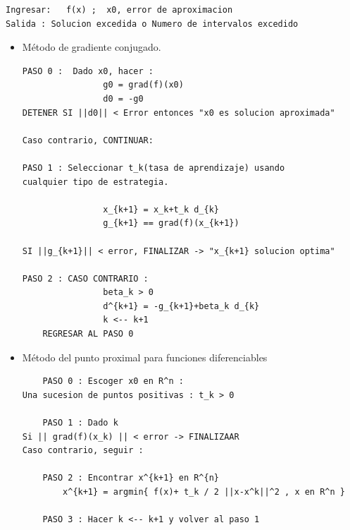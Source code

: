 \documentclass[11pt]{article}
\begin{document}
\begin{lstlisting}
Ingresar:   f(x) ;  x0, error de aproximacion
Salida : Solucion excedida o Numero de intervalos excedido
\end{lstlisting}

\begin{itemize}


    \item Método de gradiente conjugado.
\begin{lstlisting}
PASO 0 :  Dado x0, hacer : 
                g0 = grad(f)(x0)
                d0 = -g0
DETENER SI ||d0|| < Error entonces "x0 es solucion aproximada"

Caso contrario, CONTINUAR:

PASO 1 : Seleccionar t_k(tasa de aprendizaje) usando 
cualquier tipo de estrategia.

                x_{k+1} = x_k+t_k d_{k}
                g_{k+1} == grad(f)(x_{k+1})

SI ||g_{k+1}|| < error, FINALIZAR -> "x_{k+1} solucion optima"

PASO 2 : CASO CONTRARIO : 
                beta_k > 0
                d^{k+1} = -g_{k+1}+beta_k d_{k}
                k <-- k+1
    REGRESAR AL PASO 0
\end{lstlisting}    

\item Método del punto proximal para funciones diferenciables
\begin{lstlisting}
    PASO 0 : Escoger x0 en R^n :
Una sucesion de puntos positivas : t_k > 0

    PASO 1 : Dado k
Si || grad(f)(x_k) || < error -> FINALIZAAR
Caso contrario, seguir :
    
    PASO 2 : Encontrar x^{k+1} en R^{n}
        x^{k+1} = argmin{ f(x)+ t_k / 2 ||x-x^k||^2 , x en R^n }

    PASO 3 : Hacer k <-- k+1 y volver al paso 1
\end{lstlisting}




 

\end{itemize}
\end{document}
